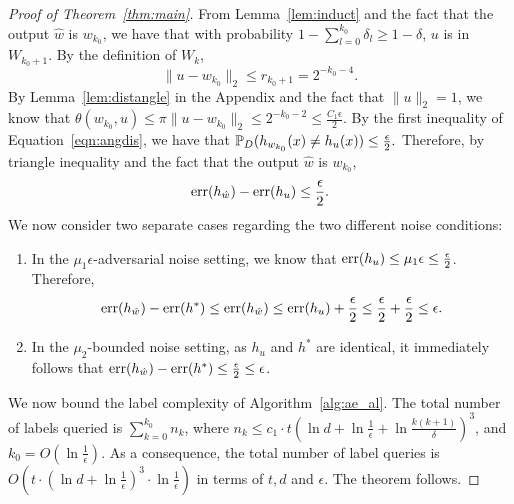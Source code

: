 \begin{proof}[Proof of Theorem~\ref{thm:main}]
From Lemma~\ref{lem:induct} and the fact that the output $\hat{w}$ is $w_{k_0}$, we have that with probability $1-\sum_{l=0}^{k_0}\delta_l \geq 1-\delta$, $u$ is in $W_{k_0+1}$. By the definition of $W_k$,
\[ \| u - w_{k_0} \|_2 \leq r_{k_0+1} = 2^{-k_0 - 4}. \]
By Lemma~\ref{lem:distangle} in the Appendix and the fact that $\|u\|_2 = 1$, we know that
$\theta(w_{k_0}, u) \leq \pi \| u - w_{k_0} \|_2 \leq 2^{-k_0 - 2} \leq \frac{C_1\epsilon}{2}$.
By the first inequality of Equation~\eqref{eqn:angdis}, we have that
$ \P_D (h_{w_{k_0}}(x) \neq h_{u}(x) ) \leq \frac \epsilon 2. $
Therefore, by triangle inequality and the fact that the output $\hat{w}$ is $w_{k_0}$,
\[ \err(h_{\hat{w}}) - \err(h_u) \leq \frac \epsilon 2. \]
We now consider two separate cases regarding the two different noise conditions:
\begin{enumerate}
\item In the $\mu_1 \epsilon$-adversarial noise setting, we know that $\err(h_u) \leq \mu_1 \epsilon \leq \frac \epsilon 2$.
Therefore,
\[ \err(h_{\hat{w}}) - \err(h^*) \leq \err(h_{\hat{w}}) \leq \err(h_u) + \frac \epsilon 2 \leq \frac \epsilon 2 + \frac \epsilon 2 \leq \epsilon. \]
\item In the $\mu_2$-bounded noise setting, as $h_u$ and $h^*$ are identical,
it immediately follows that $\err(h_{\hat{w}}) - \err(h^*) \leq \frac \epsilon 2 \leq \epsilon$.
\end{enumerate}

We now bound the label complexity of Algorithm~\ref{alg:ae_al}. The total number of labels queried is $\sum_{k=0}^{k_0} n_k$,
where $n_k \leq c_1 \cdot t (\ln d + \ln \frac 1 \epsilon + \ln \frac{k(k+1)}{\delta})^3$, and $k_0 = O(\ln\frac1\epsilon)$.
As a consequence, the total number of label queries is $O(t \cdot (\ln d + \ln \frac 1 \epsilon)^3 \cdot \ln \frac 1 \epsilon)$ in terms of $t, d$ and $\epsilon$.
The theorem follows.
\end{proof}




